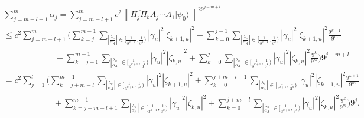\documentclass[letterpaper,onecolumn,11pt,accepted=2026-02-14]{quantumarticle}
\newcommand{\abs}[1]{\left\lvert#1\right\rvert}
\newcommand{\norm}[1]{\left\lVert#1\right\rVert}
\theoremstyle{remark}
\theoremstyle{plain}
\newcommand{\ket}[1]{|#1\rangle}
\begin{document}
\begin{equation}
\begin{aligned}
    &\sum_{j=m-l+1}^m\alpha_j
    =\sum_{j=m-l+1}^{m}c^2\norm{\overline{\Pi_{j}\Pi_b}A_{j}\cdots A_1\ket{\psi_0}}^29^{j-m+l}\\
    &\leq c^2\sum_{j=m-l+1}^m\Bigg(
    \sum_{k=j}^{m-1}\sum_{\abs{\frac{\lambda_u}{\alpha_A}}\in\big[\frac{1}{3^{k+1}},\frac{1}{3^k}\big)}\abs{\gamma_u}^2\abs{\zeta_{k+1,u}}^2
    +\sum_{k=0}^{j-1}\sum_{\abs{\frac{\lambda_u}{\alpha_A}}\in\big[\frac{1}{3^{k+1}},\frac{1}{3^k}\big)}\abs{\gamma_u}^2\abs{\zeta_{k+1,u}}^2\frac{9^{k+1}}{9^m}\\
    &\qquad\qquad\qquad\ +\sum_{k=j+1}^{m-1}\sum_{\abs{\frac{\lambda_u}{\alpha_A}}\in\big[\frac{1}{3^{k+1}},\frac{1}{3^k}\big)}\abs{\gamma_u}^2\abs{\zeta_{k,u}}^2
    +\sum_{k=0}^{j}\sum_{\abs{\frac{\lambda_u}{\alpha_A}}\in\big[\frac{1}{3^{k+1}},\frac{1}{3^k}\big)}\abs{\gamma_u}^2\abs{\zeta_{k,u}}^2\frac{9^k}{9^m}\Bigg)9^{j-m+l}\\
    &=c^2\sum_{j=1}^{l}\Bigg(
    \sum_{k=j+m-l}^{m-1}\sum_{\abs{\frac{\lambda_u}{\alpha_A}}\in\big[\frac{1}{3^{k+1}},\frac{1}{3^k}\big)}\abs{\gamma_u}^2\abs{\zeta_{k+1,u}}^2
    +\sum_{k=0}^{j+m-l-1}\sum_{\abs{\frac{\lambda_u}{\alpha_A}}\in\big[\frac{1}{3^{k+1}},\frac{1}{3^k}\big)}\abs{\gamma_u}^2\abs{\zeta_{k+1,u}}^2\frac{9^{k+1}}{9^m}\\
    &\qquad\qquad\qquad+\sum_{k=j+m-l+1}^{m-1}\sum_{\abs{\frac{\lambda_u}{\alpha_A}}\in\big[\frac{1}{3^{k+1}},\frac{1}{3^k}\big)}\abs{\gamma_u}^2\abs{\zeta_{k,u}}^2
    +\sum_{k=0}^{j+m-l}\sum_{\abs{\frac{\lambda_u}{\alpha_A}}\in\big[\frac{1}{3^{k+1}},\frac{1}{3^k}\big)}\abs{\gamma_u}^2\abs{\zeta_{k,u}}^2\frac{9^k}{9^m}\Bigg)9^{j}.\\
\end{aligned}
\end{equation}
\end{document}

